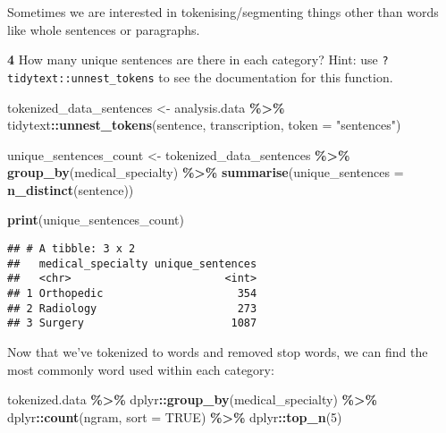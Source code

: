\documentclass[
]{article}
\newenvironment{Shaded}{\begin{snugshade}}{\end{snugshade}}
\newcommand{\AttributeTok}[1]{\textcolor[rgb]{0.13,0.29,0.53}{#1}}
\newcommand{\ConstantTok}[1]{\textcolor[rgb]{0.56,0.35,0.01}{#1}}
\newcommand{\DecValTok}[1]{\textcolor[rgb]{0.00,0.00,0.81}{#1}}
\newcommand{\FunctionTok}[1]{\textcolor[rgb]{0.13,0.29,0.53}{\textbf{#1}}}
\newcommand{\NormalTok}[1]{#1}
\newcommand{\OtherTok}[1]{\textcolor[rgb]{0.56,0.35,0.01}{#1}}
\newcommand{\SpecialCharTok}[1]{\textcolor[rgb]{0.81,0.36,0.00}{\textbf{#1}}}
\newcommand{\StringTok}[1]{\textcolor[rgb]{0.31,0.60,0.02}{#1}}
\begin{document}
Sometimes we are interested in tokenising/segmenting things other than
words like whole sentences or paragraphs.

\textbf{4} How many unique sentences are there in each category? Hint:
use \texttt{?tidytext::unnest\_tokens} to see the documentation for this
function.

\begin{Shaded}
\begin{Highlighting}[]
\NormalTok{tokenized\_data\_sentences }\OtherTok{\textless{}{-}}\NormalTok{ analysis.data }\SpecialCharTok{\%\textgreater{}\%}
\NormalTok{  tidytext}\SpecialCharTok{::}\FunctionTok{unnest\_tokens}\NormalTok{(sentence, transcription, }\AttributeTok{token =} \StringTok{"sentences"}\NormalTok{)}

\NormalTok{unique\_sentences\_count }\OtherTok{\textless{}{-}}\NormalTok{ tokenized\_data\_sentences  }\SpecialCharTok{\%\textgreater{}\%}
  \FunctionTok{group\_by}\NormalTok{(medical\_specialty) }\SpecialCharTok{\%\textgreater{}\%}
  \FunctionTok{summarise}\NormalTok{(}\AttributeTok{unique\_sentences =} \FunctionTok{n\_distinct}\NormalTok{(sentence))}

\FunctionTok{print}\NormalTok{(unique\_sentences\_count)}
\end{Highlighting}
\end{Shaded}

\begin{verbatim}
## # A tibble: 3 x 2
##   medical_specialty unique_sentences
##   <chr>                        <int>
## 1 Orthopedic                     354
## 2 Radiology                      273
## 3 Surgery                       1087
\end{verbatim}

Now that we've tokenized to words and removed stop words, we can find
the most commonly word used within each category:

\begin{Shaded}
\begin{Highlighting}[]
\NormalTok{tokenized.data }\SpecialCharTok{\%\textgreater{}\%}
\NormalTok{  dplyr}\SpecialCharTok{::}\FunctionTok{group\_by}\NormalTok{(medical\_specialty) }\SpecialCharTok{\%\textgreater{}\%}
\NormalTok{  dplyr}\SpecialCharTok{::}\FunctionTok{count}\NormalTok{(ngram, }\AttributeTok{sort =} \ConstantTok{TRUE}\NormalTok{) }\SpecialCharTok{\%\textgreater{}\%}
\NormalTok{  dplyr}\SpecialCharTok{::}\FunctionTok{top\_n}\NormalTok{(}\DecValTok{5}\NormalTok{)}
\end{Highlighting}
\end{Shaded}
\end{document}
